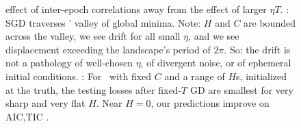 \begin{figure}[h!]
{                effect of inter-epoch correlations away from the effect of
                larger $\eta T$.
                \protect{}: SGD traverses \Helix' valley of global
                minima.  Note: $H$ and $C$ are bounded across the valley,
                we see drift for all small $\eta$, and we see displacement
                exceeding the landscape's period of $2\pi$.  So: the drift
                is not a pathology of well-chosen $\eta$, of divergent
                noise, or of ephemeral initial conditions. 
                \protect{}: For \MeanEstimation\, with fixed $C$ and
                a range of $H$s, initialized at the truth, the testing
                losses after fixed-$T$ GD are smallest for very sharp and
                very flat $H$.  Near $H=0$, our predictions improve on AIC,TIC
                \citep{di18}.
            }
            \label{fig:experiments}
        \end{figure}



